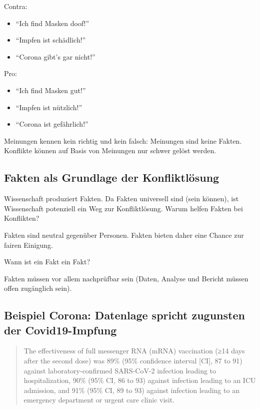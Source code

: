 \documentclass[
  a4paper,
  DIV=11]{scrreprt}
\providecommand{\tightlist}{%
  \setlength{\itemsep}{0pt}\setlength{\parskip}{0pt}}\usepackage{longtable,booktabs,array}
\theoremstyle{definition}
\theoremstyle{remark}
\begin{document}
Contra:

\begin{itemize}
\tightlist
\item
  ``Ich find Masken doof!''
\item
  ``Impfen ist schädlich!''
\item
  ``Corona gibt's gar nicht!''
\end{itemize}

Pro:

\begin{itemize}
\tightlist
\item
  ``Ich find Masken gut!''
\item
  ``Impfen ist nützlich!''
\item
  ``Corona ist gefährlich!''
\end{itemize}

Meinungen kennen kein richtig und kein falsch: Meinungen sind keine
Fakten. Konflikte können auf Basis von Meinungen nur schwer gelöst
werden.

\hypertarget{fakten-als-grundlage-der-konfliktluxf6sung}{%
\subsection{Fakten als Grundlage der
Konfliktlösung}\label{fakten-als-grundlage-der-konfliktluxf6sung}}

Wissenschaft produziert Fakten. Da Fakten universell sind (sein können),
ist Wissenschaft potenziell ein Weg zur Konfliktlösung. Warum helfen
Fakten bei Konflikten?

Fakten sind neutral gegenüber Personen. Fakten bieten daher eine Chance
zur fairen Einigung.

Wann ist ein Fakt ein Fakt?

Fakten müssen vor allem nachprüfbar sein (Daten, Analyse und Bericht
müssen offen zugänglich sein).

\hypertarget{beispiel-corona-datenlage-spricht-zugunsten-der-covid19-impfung}{%
\subsection{Beispiel Corona: Datenlage spricht zugunsten der
Covid19-Impfung}\label{beispiel-corona-datenlage-spricht-zugunsten-der-covid19-impfung}}

\begin{quote}
The effectiveness of full messenger RNA (mRNA) vaccination (≥14 days
after the second dose) was 89\% (95\% confidence interval {[}CI{]}, 87
to 91) against laboratory-confirmed SARS-CoV-2 infection leading to
hospitalization, 90\% (95\% CI, 86 to 93) against infection leading to
an ICU admission, and 91\% (95\% CI, 89 to 93) against infection leading
to an emergency department or urgent care clinic visit.
\end{quote}
\end{document}
